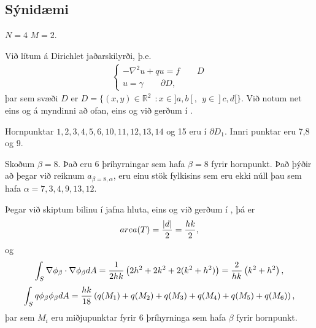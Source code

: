 \documentclass[a4paper,10pt,icelandic]{sphinxmanual}
\begin{document}
\subsection{Sýnidæmi}
\label{\detokenize{Kafli06:id1}}

 \(N=4\)  \(M=2\).

Við lítum á Dirichlet jaðarskilyrði, þ.e.
\begin{equation*}
\begin{split}\begin{cases}
-\nabla^2 u +q u= f \qquad D\\
u=\gamma \qquad \partial D,
\end{cases}\end{split}
\end{equation*}
þar sem svæði \(D\) er \(D=\{(x,y)\in \mathbb{R}^2~~: x\in]a, b[, ~~ y\in ]c, d[\}\). Við notum net eins og á myndinni að ofan, eins og við gerðum í {\hyperref[\detokenize{Kafli06:ch-6-5-1}]{}}.

Hornpunktar \(1,2,3,4,5,6,10,11,12,13,14\) og 15 eru í \(\partial D_1\). Innri punktar eru 7,8 og 9.

Skoðum \(\beta=8\). Það eru 6 þríhyrningar sem hafa \(\beta=8\) fyrir hornpunkt. Það þýðir að þegar við reiknum \(a_{\beta=8,\alpha}\), eru einu stök fylkisins sem eru ekki núll þau sem hafa \(\alpha=7,3,4,9,13,12\).

Þegar við skiptum bilinu í jafna hluta, eins og við gerðum í {\hyperref[\detokenize{Kafli06:ch-6-5-1}]{}}, þá er
\begin{equation*}
\begin{split}area(T)={|d|\over 2} ={h k\over 2},\end{split}
\end{equation*}
og
\begin{equation*}
\begin{split}\int_S \nabla \phi_\beta\cdot \nabla \phi_\beta dA=
{1\over 2 h k}\left(2 h^2+2 k^2 +2 (k^2+h^2)\right)=
{2\over h k}\left(k^2+h^2\right),\end{split}
\end{equation*}\begin{equation*}
\begin{split}\int_S q \phi_\beta  \phi_\beta dA= {h k\over 18} \left(q(M_1)+q(M_2)+q(M_3)+q(M_4)+q(M_5)+q(M_6)\right),\end{split}
\end{equation*}
þar sem \(M_i\) eru miðjupunktar fyrir 6 þríhyrninga sem hafa \(\beta\) fyrir hornpunkt.
\end{document}

